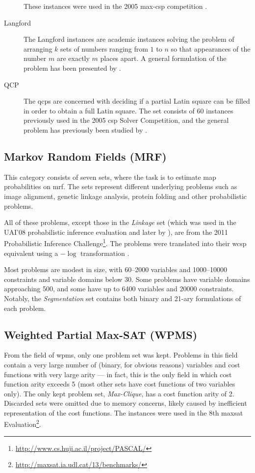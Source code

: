 \begin{description}
		These instances were used in the 2005 max-\gls{csp} competition \parencite{Boussemart05}.
	\item[Langford]
		The Langford instances are academic instances solving the problem of arranging \(k\) sets of numbers ranging from \(1\) to \(n\) so that appearances of the number \(m\) are exactly \(m\) places apart.
		A general formulation of the problem has been presented by \textcite{Linek03}.
	\item[QCP]
		The \glspl{qcp} are concerned with deciding if a partial Latin square can be filled in order to obtain a full Latin square.
		The set consists of 60 instances previously used in the 2005 \gls{csp} Solver Competition, and the general problem has previously been studied by \textcite{Gomes02}.
\end{description}

\subsection{Markov Random Fields (MRF)}
This category consists of seven sets, where the task is to estimate \gls{map} probabilities on \gls{mrf}. The sets represent different underlying problems such as image alignment, genetic linkage analysis, protein folding and other probabilistic problems.

All of these problems, except those in the \emph{Linkage} set (which was used in the UAI'08 probabilistic inference evaluation and later by \textcites{Favier11}{Kishimoto13}), are from the 2011 Probabilistic Inference Challenge\footnote{\url{http://www.cs.huji.ac.il/project/PASCAL/}}.
The problems were translated into their \gls{wcsp} equivalent using a \(-\log{}\) transformation \parencite{deGivry14}.

Most problems are modest in size, with \numrange{60}{2000} variables and \numrange{1000}{10000} constraints and variable domains below \num{30}.
Some problems have variable domains approaching \num{500}, and some have up to \num{6400} variables and \num{20000} constraints.
Notably, the \emph{Segmentation} set contains both binary and 21-ary formulations of each problem.

\subsection{Weighted Partial Max-SAT (WPMS)}
From the field of \gls{wpms}, only one problem set was kept.
Problems in this field contain a very large number of (binary, for obvious reasons) variables and cost functions with very large arity --- in fact, this is the only field in which cost function arity exceeds \num{5} (most other sets have cost functions of two variables only).
The only kept problem set, \emph{Max-Clique}, has a cost function arity of \num{2}.
Discarded sets were omitted due to memory concerns, likely caused by inefficient representation of the cost functions.
The instances were used in the 8th \Gls{maxsat} Evaluation\footnote{\url{http://maxsat.ia.udl.cat/13/benchmarks/}}.

